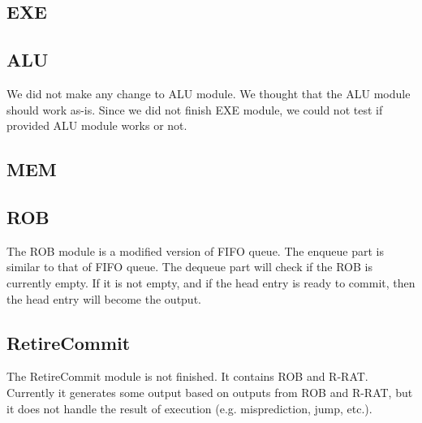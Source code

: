 \documentclass[a4paper,11pt]{article}
\begin{document}
\subsection{EXE}

\subsection{ALU}
We did not make any change to ALU module. We thought that the ALU module should work as-is. Since we did not finish EXE module, we could not test if provided ALU module works or not.

\subsection{MEM}

\subsection{ROB}
The ROB module is a modified version of FIFO queue. The enqueue part is similar to that of FIFO queue. The dequeue part will check if the ROB is currently empty. If it is not empty, and if the head entry is ready to commit, then the head entry will become the output.

\subsection{RetireCommit}
The RetireCommit module is not finished. It contains ROB and R-RAT. Currently it generates some output based on outputs from ROB and R-RAT, but it does not handle the result of execution (e.g. misprediction, jump, etc.).
\end{document}
